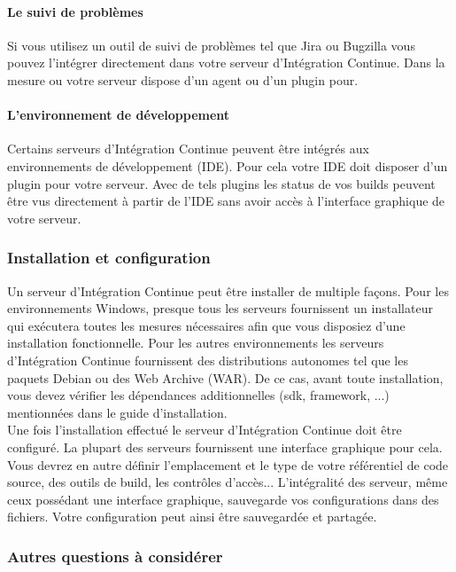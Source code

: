       \paragraph{Le suivi de problèmes} Si vous utilisez un outil de suivi de problèmes tel que Jira ou Bugzilla vous pouvez l'intégrer directement dans votre serveur d'Intégration Continue. Dans la mesure ou votre serveur dispose d'un agent ou d'un plugin pour.
      \paragraph{L'environnement de développement} Certains serveurs d'Intégration Continue peuvent être intégrés aux environnements de développement (IDE). Pour cela votre IDE doit disposer d'un plugin pour votre serveur. Avec de tels plugins les status de vos builds peuvent être vus directement à partir de l'IDE sans avoir accès à l'interface graphique de votre serveur.

      \subsubsection{Installation et configuration}
      Un serveur d'Intégration Continue peut être installer de multiple façons. Pour les environnements Windows, presque tous les serveurs fournissent un installateur qui exécutera toutes les mesures nécessaires afin que vous disposiez d'une installation fonctionnelle. Pour les autres environnements les serveurs d'Intégration Continue fournissent des distributions autonomes tel que les paquets Debian ou des Web Archive (WAR). De ce cas, avant toute installation, vous devez vérifier les dépendances additionnelles (sdk, framework, ...) mentionnées dans le guide d'installation.\\

      Une fois l'installation effectué le serveur d'Intégration Continue doit être configuré. La plupart des serveurs fournissent une interface graphique pour cela. Vous devrez en autre définir l'emplacement et le type de votre référentiel de code source, des outils de build, les contrôles d'accès... L'intégralité des serveur, même ceux possédant une interface graphique, sauvegarde vos configurations dans des fichiers. Votre configuration peut ainsi être sauvegardée et partagée.

      \subsubsection{Autres questions à considérer}
